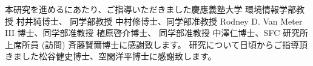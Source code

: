 \begin{acknowledgment}

本研究を進めるにあたり、ご指導いただきました慶應義塾大学 環境情報学部教授 村井純博士、
同学部教授 中村修博士、同学部准教授 Rodney D. Van Meter III 博士、同学部准教授 植原啓介博士、
同学部准教授 中澤仁博士、SFC 研究所 上席所員 (訪問) 斉藤賢爾博士に感謝致します。
研究について日頃からご指導頂きました松谷健史博士、空閑洋平博士に感謝致します。

\end{acknowledgment}
